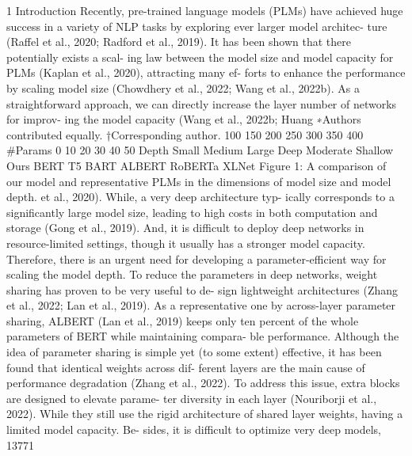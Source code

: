 1 Introduction Recently, pre-trained language models (PLMs) have achieved huge success in a variety of NLP tasks by exploring ever larger model architec- ture (Raffel et al., 2020; Radford et al., 2019). It has been shown that there potentially exists a scal- ing law between the model size and model capacity for PLMs (Kaplan et al., 2020), attracting many ef- forts to enhance the performance by scaling model size (Chowdhery et al., 2022; Wang et al., 2022b). As a straightforward approach, we can directly increase the layer number of networks for improv- ing the model capacity (Wang et al., 2022b; Huang ∗Authors contributed equally. †Corresponding author. 100 150 200 250 300 350 400 #Params 0 10 20 30 40 50 Depth Small Medium Large Deep Moderate Shallow Ours BERT T5 BART ALBERT RoBERTa XLNet Figure 1: A comparison of our model and representative PLMs in the dimensions of model size and model depth. et al., 2020). While, a very deep architecture typ- ically corresponds to a significantly large model size, leading to high costs in both computation and storage (Gong et al., 2019). And, it is difficult to deploy deep networks in resource-limited settings, though it usually has a stronger model capacity. Therefore, there is an urgent need for developing a parameter-efficient way for scaling the model depth. To reduce the parameters in deep networks, weight sharing has proven to be very useful to de- sign lightweight architectures (Zhang et al., 2022; Lan et al., 2019). As a representative one by across-layer parameter sharing, ALBERT (Lan et al., 2019) keeps only ten percent of the whole parameters of BERT while maintaining compara- ble performance. Although the idea of parameter sharing is simple yet (to some extent) effective, it has been found that identical weights across dif- ferent layers are the main cause of performance degradation (Zhang et al., 2022). To address this issue, extra blocks are designed to elevate parame- ter diversity in each layer (Nouriborji et al., 2022). While they still use the rigid architecture of shared layer weights, having a limited model capacity. Be- sides, it is difficult to optimize very deep models, 13771

